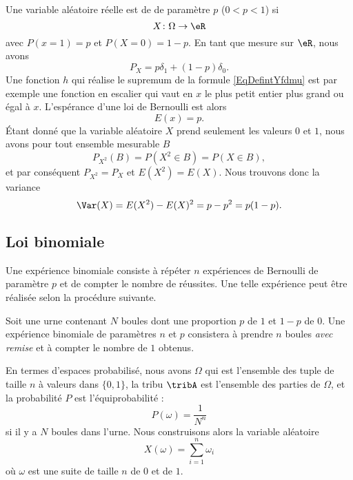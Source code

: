 Une variable aléatoire réelle est de  de paramètre \( p\) (\( 0<p<1\)) si
\begin{equation}
    X\colon \Omega\to \eR
\end{equation}
avec \( P(x=1)=p\) et \( P(X=0)=1-p\). En tant que mesure sur \( \eR\), nous avons
\begin{equation}
    P_X=p\delta_1+(1-p)\delta_0.
\end{equation}
Une fonction \( h\) qui réalise le supremum de la formule \eqref{EqDefintYfdmu} est par exemple une fonction en escalier qui vaut en \( x\) le plus petit entier plus grand ou égal à \( x\). L'espérance d'une loi de Bernoulli est alors
\begin{equation}
    E(x)=p.
\end{equation}
Étant donné que la variable aléatoire \( X\) prend seulement les valeurs \( 0\) et \( 1\), nous avons pour tout ensemble mesurable \( B\)
\begin{equation}
    P_{X^2}(B)=P(X^2\in B)=P(X\in B),
\end{equation}
et par conséquent \( P_{X^2}=P_X\) et \( E(X^2)=E(X)\). Nous trouvons donc la variance
\begin{equation}        \label{EqVarBern}
    \Var(X)=E(X^2)-E(X)^2=p-p^2=p(1-p).
\end{equation}

\subsection{Loi binomiale}

Une expérience binomiale consiste à répéter \( n\) expériences de Bernoulli de paramètre \( p\) et de compter le nombre de réussites. Une telle expérience peut être réalisée selon la procédure suivante.

Soit une urne contenant \( N\) boules dont une proportion \( p\) de \( 1\) et \( 1-p\) de \( 0\). Une expérience binomiale de paramètres \( n\) et \( p\) consistera à prendre \( n\) boules \emph{avec remise} et à compter le nombre de \( 1\) obtenus.

En termes d'espaces probabilisé, nous avons \( \Omega\) qui est l'ensemble des tuple de taille \( n\) à valeurs dans \( \{ 0,1 \}\), la tribu \( \tribA\) est l'ensemble des parties de \( \Omega\), et la probabilité \( P\) est l'équiprobabilité :
\begin{equation}
    P(\omega)=\frac{1}{ N^n }
\end{equation}
si il y a \( N\) boules dans l'urne. Nous construisons alors la variable aléatoire
\begin{equation}
    X(\omega)=\sum_{i=1}^n\omega_i
\end{equation}
où \( \omega\) est une suite de taille \( n\) de $0$ et de \( 1\).

